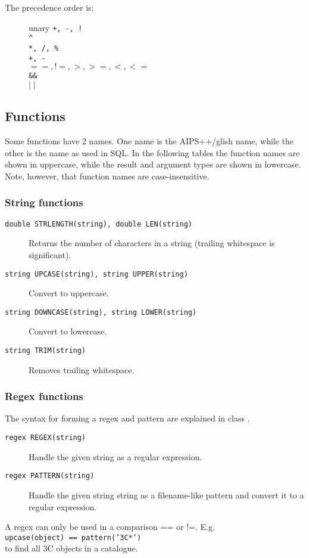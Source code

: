 \begin{description}
  \item[The precedence order is:]
       unary \texttt{+, -, !}
       \\\verb+^+
       \\\texttt{*, /, \%}
       \\\texttt{+, -}
       \\\texttt{$==, !=, >, >=, <, <=$}
       \\\texttt{\&\&}
       \\\texttt{$\mid\mid$}
\end{description}

\label{TAQL:FUNCTIONS}
\subsection{Functions}
Some functions have 2 names. One name is the AIPS++/glish name, while the
other is the name as used in SQL.
In the following tables the function names are shown in uppercase,
while the result and argument types are shown in lowercase.
Note, however, that function names are case-insensitive.
\subsubsection{String functions}
\begin{description}
  \item[ \texttt{double STRLENGTH(string),  double LEN(string)}]
       Returns the number of characters in a string
       (trailing whitespace is significant).
  \item[ \texttt{string UPCASE(string), string UPPER(string) }]
        Convert to uppercase.
  \item[ \texttt{string DOWNCASE(string),  string LOWER(string)}]
        Convert to lowercase.
  \item[ \texttt{string TRIM(string)}]
       Removes trailing whitespace.
\end{description}

\subsubsection{Regex functions}
The syntax for forming a regex and pattern are explained in class
.
\begin{description}
  \item[ \texttt{regex REGEX(string)}]
      Handle the given string as a regular expression.
  \item[ \texttt{regex PATTERN(string)}]
       Handle the given string string as a filename-like pattern and
       convert it to a regular expression.
\end{description}
A regex can only be used in a comparison == or !=. E.g.
\\\texttt{upcase(object) == pattern('3C*')}
\\to find all 3C objects in a catalogue.

